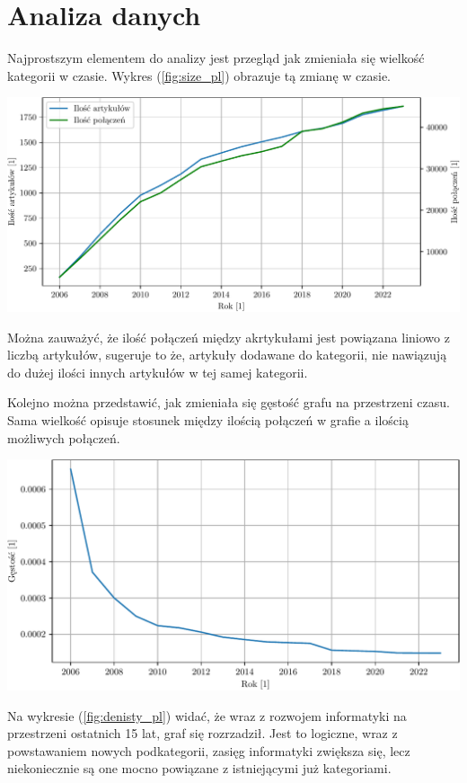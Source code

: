 \documentclass[a4paper, 12pt]{article}
\begin{document}
\section{Analiza danych}
Najprostszym elementem do analizy jest przegląd jak zmieniała się wielkość kategorii w czasie. Wykres (\ref{fig:size_pl}) obrazuje tą zmianę w czasie.
\begin{center}
    \includegraphics[width=0.90\linewidth]{figures/size_pl.pdf}
    \label{fig:size_pl}
\end{center}
Można zauważyć, że ilość połączeń między akrtykułami jest powiązana liniowo z liczbą artykułów, sugeruje to że, artykuły dodawane do kategorii, nie nawiązują do dużej ilości innych artykułów w tej samej kategorii.

Kolejno można przedstawić, jak zmieniała się gęstość grafu na przestrzeni czasu. Sama wielkość opisuje stosunek między ilością połączeń w grafie a ilością możliwych połączeń.
\begin{center}
    \includegraphics[width=0.90\linewidth]{figures/density_pl.pdf}
    \label{fig:denisty_pl}
\end{center}
Na wykresie (\ref{fig:denisty_pl}) widać, że wraz z rozwojem informatyki na przestrzeni ostatnich 15 lat, graf się rozrzadził. Jest to logiczne, wraz z powstawaniem nowych podkategorii, zasięg informatyki zwiększa się, lecz niekoniecznie są one mocno powiązane z istniejącymi już kategoriami.
\end{document}
